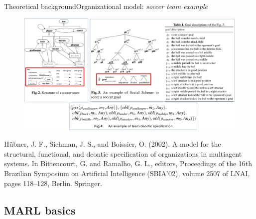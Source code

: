 \begin{frame}{Theoretical background}{Organizational model: \textit{soccer team example}}

    \vspace{-4ex}
    \begin{figure}
        \centering
        \includegraphics[width=0.85\linewidth]{figures/soccer_os.png}
    \end{figure}

    \begin{spacing}{0.25}
        {\tiny Hübner, J. F., Sichman, J. S., and Boissier, O. (2002).
            A model for the structural, functional, and deontic specification of
            organizations in multiagent systems.
            In Bittencourt, G. and Ramalho, G. L., editors, Proceedings of the 16th Brazilian Symposium on Artificial Intelligence (SBIA’02), volume 2507 of LNAI, pages 118–128, Berlin. Springer.}
    \end{spacing}


\end{frame}


\subsection{MARL basics}

